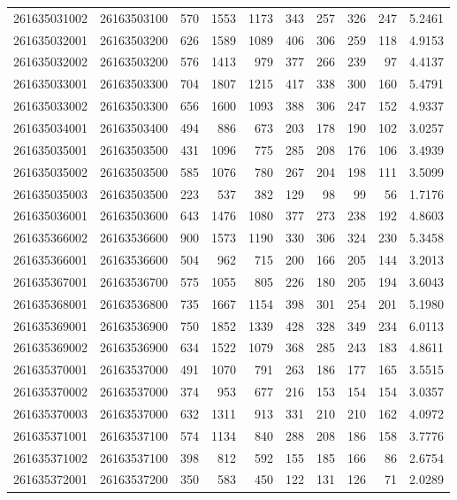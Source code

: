 \documentclass[
  11pt,
]{article}
\begin{document}
\begin{longtable}[t]{llrrrrrrrr}
261635031002 & 26163503100 & 570 & 1553 & 1173 & 343 & 257 & 326 & 247 & 5.2461\\
261635032001 & 26163503200 & 626 & 1589 & 1089 & 406 & 306 & 259 & 118 & 4.9153\\
261635032002 & 26163503200 & 576 & 1413 & 979 & 377 & 266 & 239 & 97 & 4.4137\\
261635033001 & 26163503300 & 704 & 1807 & 1215 & 417 & 338 & 300 & 160 & 5.4791\\
261635033002 & 26163503300 & 656 & 1600 & 1093 & 388 & 306 & 247 & 152 & 4.9337\\
261635034001 & 26163503400 & 494 & 886 & 673 & 203 & 178 & 190 & 102 & 3.0257\\
261635035001 & 26163503500 & 431 & 1096 & 775 & 285 & 208 & 176 & 106 & 3.4939\\
261635035002 & 26163503500 & 585 & 1076 & 780 & 267 & 204 & 198 & 111 & 3.5099\\
261635035003 & 26163503500 & 223 & 537 & 382 & 129 & 98 & 99 & 56 & 1.7176\\
261635036001 & 26163503600 & 643 & 1476 & 1080 & 377 & 273 & 238 & 192 & 4.8603\\
261635366002 & 26163536600 & 900 & 1573 & 1190 & 330 & 306 & 324 & 230 & 5.3458\\
261635366001 & 26163536600 & 504 & 962 & 715 & 200 & 166 & 205 & 144 & 3.2013\\
261635367001 & 26163536700 & 575 & 1055 & 805 & 226 & 180 & 205 & 194 & 3.6043\\
261635368001 & 26163536800 & 735 & 1667 & 1154 & 398 & 301 & 254 & 201 & 5.1980\\
261635369001 & 26163536900 & 750 & 1852 & 1339 & 428 & 328 & 349 & 234 & 6.0113\\
261635369002 & 26163536900 & 634 & 1522 & 1079 & 368 & 285 & 243 & 183 & 4.8611\\
261635370001 & 26163537000 & 491 & 1070 & 791 & 263 & 186 & 177 & 165 & 3.5515\\
261635370002 & 26163537000 & 374 & 953 & 677 & 216 & 153 & 154 & 154 & 3.0357\\
261635370003 & 26163537000 & 632 & 1311 & 913 & 331 & 210 & 210 & 162 & 4.0972\\
261635371001 & 26163537100 & 574 & 1134 & 840 & 288 & 208 & 186 & 158 & 3.7776\\
261635371002 & 26163537100 & 398 & 812 & 592 & 155 & 185 & 166 & 86 & 2.6754\\
261635372001 & 26163537200 & 350 & 583 & 450 & 122 & 131 & 126 & 71 & 2.0289\\

\end{longtable}
\end{document}
